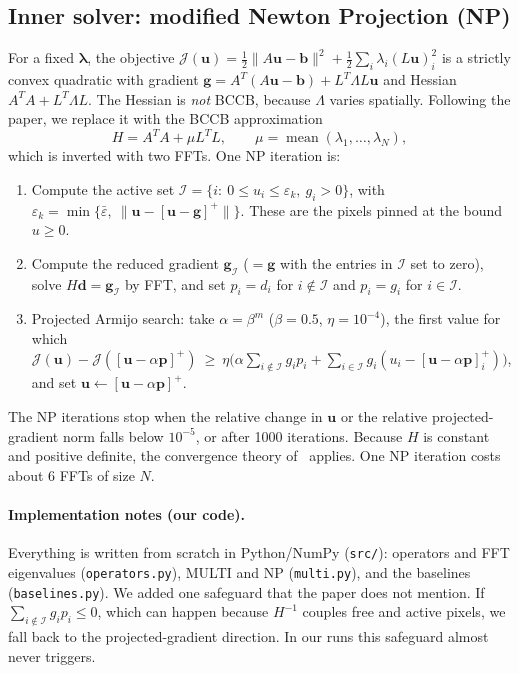 \subsection{Inner solver: modified Newton Projection (NP)}
For a fixed $\boldsymbol\lambda$, the objective
$\mathcal J(\mathbf u)=\frac12\|A\mathbf u-\mathbf b\|^2+\frac12\sum_i\lambda_i(L\mathbf u)_i^2$
is a strictly convex quadratic with gradient
$\mathbf g=A^T(A\mathbf u-\mathbf b)+L^T\Lambda L\mathbf u$ and Hessian
$A^TA+L^T\Lambda L$. The Hessian is \emph{not} BCCB, because $\Lambda$ varies
spatially. Following the paper, we replace it with the BCCB approximation
\begin{equation}
  H = A^TA+\mu L^TL,\qquad \mu=\operatorname{mean}(\lambda_1,\dots,\lambda_N),
  \label{eq:H}
\end{equation}
which is inverted with two FFTs. One NP iteration is:
\begin{enumerate}[leftmargin=*,itemsep=1pt]
\item Compute the active set
  $\mathcal I=\{i:\ 0\le u_i\le\varepsilon_k,\ g_i>0\}$, with
  $\varepsilon_k=\min\{\bar\varepsilon,\ \|\mathbf u-[\mathbf u-\mathbf g]^+\|\}$.
  These are the pixels pinned at the bound $u\ge0$.
\item Compute the reduced gradient $\mathbf g_{\mathcal I}$ ($=\mathbf g$ with the
  entries in $\mathcal I$ set to zero), solve $H\mathbf d=\mathbf g_{\mathcal I}$ by FFT,
  and set $p_i=d_i$ for $i\notin\mathcal I$ and $p_i=g_i$ for $i\in\mathcal I$.
\item Projected Armijo search: take $\alpha=\beta^m$ ($\beta=0.5$, $\eta=10^{-4}$), the first value for which
  $\mathcal J(\mathbf u)-\mathcal J([\mathbf u-\alpha\mathbf p]^+)\ \ge\ \eta\big(\alpha\sum_{i\notin\mathcal I}g_ip_i+\sum_{i\in\mathcal I}g_i(u_i-[\mathbf u-\alpha\mathbf p]^+_i)\big)$,
  and set $\mathbf u\leftarrow[\mathbf u-\alpha\mathbf p]^+$.
\end{enumerate}
The NP iterations stop when the relative change in $\mathbf u$ or the relative
projected-gradient norm falls below $10^{-5}$, or after 1000 iterations. Because $H$ is
constant and positive definite, the convergence theory of~\cite{landi2012} applies.
One NP iteration costs about 6 FFTs of size $N$.

\paragraph{Implementation notes (our code).}
Everything is written from scratch in Python/NumPy (\texttt{src/}): operators and
FFT eigenvalues (\texttt{operators.py}), MULTI and NP (\texttt{multi.py}), and the
baselines (\texttt{baselines.py}). We added one safeguard that the paper does not
mention. If $\sum_{i\notin\mathcal I}g_ip_i\le0$, which can happen because $H^{-1}$ couples
free and active pixels, we fall back to the projected-gradient direction.
In our runs this safeguard almost never triggers.
